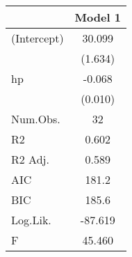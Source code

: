 \begin{table}
\centering
\begin{tabular}[t]{lS}
\toprule
  & {Model 1}\\
\midrule
(Intercept) & 30.099\\
 & (1.634)\\
hp & -0.068\\
 & (0.010)\\
\midrule
Num.Obs. & 32\\
R2 & 0.602\\
R2 Adj. & 0.589\\
AIC & 181.2\\
BIC & 185.6\\
Log.Lik. & -87.619\\
F & 45.460\\
\bottomrule
\end{tabular}
\end{table}
